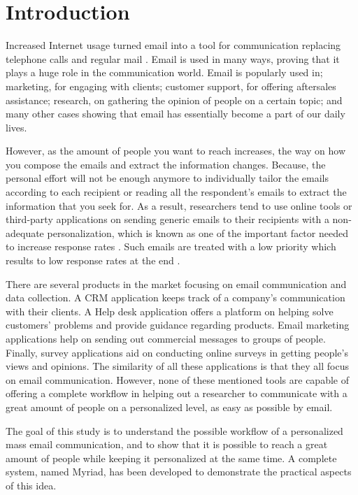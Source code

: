 \chapter{Introduction}
\label{chp:Intro}
Increased Internet usage turned email into a tool for communication replacing telephone calls and regular mail \citep{Norman2000,Madden2003}. Email is used in many ways, proving that it plays a huge role in the communication world. Email is popularly used in; marketing, for engaging with clients; customer support, for offering aftersales assistance; research,  on gathering the opinion of people on a certain topic; and many other cases showing that email has essentially become a part of our daily lives.
\vspace{1cm}

However, as the amount of people you want to reach increases, the way on how you compose the emails and extract the information changes. Because, the personal effort will not be enough anymore to individually tailor the emails according to each recipient or reading all the respondent's emails to extract the information that you seek for. As a result, researchers tend to use online tools or third-party applications on sending generic emails to their recipients with a non-adequate personalization, which is known as one of the important factor needed to increase response rates \citep{Dillman1991,Schaefer1998}. Such emails are treated with a low priority which results to low response rates at the end \citep[page 272]{DillmanDonA.SmythJoleneD.Christian2009}.
\vspace{1cm}

There are several products in the market focusing on email communication and data collection. A \ac{CRM} application keeps track of a company's communication with their clients. A Help desk application offers a platform on helping solve customers' problems and provide guidance regarding products. Email marketing applications help on sending out commercial messages to groups of people. Finally, survey applications aid on conducting online surveys in getting people's views and opinions. The similarity of all these applications is that they all focus on email communication. However, none of these mentioned tools are capable of offering a complete workflow in helping out a researcher to communicate with a great amount of people on a personalized level, as easy as possible by email.
\vspace{1cm}

The goal of this study is to understand the possible workflow of a personalized mass email communication, and to show that it is possible to reach a great amount of people while keeping it personalized at the same time. A complete system, named Myriad, has been developed to demonstrate the practical aspects of this idea.

